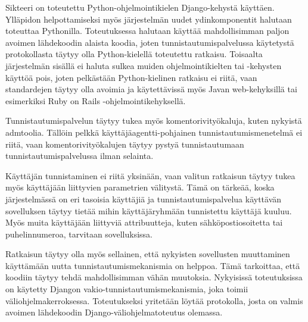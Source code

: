 Sikteeri on toteutettu Python-ohjelmointikielen Django-kehystä käyttäen. Ylläpidon helpottamiseksi myös järjestelmän uudet ydinkomponentit halutaan toteuttaa Pythonilla. Toteutuksessa halutaan käyttää mahdollisimman paljon avoimen lähdekoodin alaista koodia, joten tunnistautumispalvelussa käytetystä protokollasta täytyy olla Python-kielellä toteutettu ratkaisu. Toisaalta järjestelmän sisällä ei haluta sulkea muiden ohjelmointikielten tai -kehysten käyttöä pois, joten pelkästään Python-kielinen ratkaisu ei riitä, vaan standardejen täytyy olla avoimia ja käytettävissä myös Javan web-kehyksillä tai esimerkiksi Ruby on Rails -ohjelmointikehyksellä.

Tunnistautumispalvelun täytyy tukea myös komentorivityökaluja, kuten nykyistä admtoolia. Tällöin pelkkä käyttäjäagentti-pohjainen tunnistautumismenetelmä ei riitä, vaan komentorivityökalujen täytyy pystyä tunnistautumaan tunnistautumispalvelussa ilman selainta.

Käyttäjän tunnistaminen ei riitä yksinään, vaan valitun ratkaisun täytyy tukea myös käyttäjään liittyvien parametrien välitystä. Tämä on tärkeää, koska järjestelmässä on eri tasoisia käyttäjiä ja tunnistautumispalvelua käyttävän sovelluksen täytyy tietää mihin käyttäjäryhmään tunnistettu käyttäjä kuuluu. Myös muita käyttäjään liittyviä attribuutteja, kuten sähköpostiosoitetta tai puhelinnumeroa, tarvitaan sovelluksissa.

Ratkaisun täytyy olla myös sellainen, että nykyisten sovellusten muuttaminen käyttämään uutta tunnistautumismekanismia on helppoa. Tämä tarkoittaa, että koodiin täytyy tehdä mahdollisimman vähän muutoksia. Nykyisissä toteutuksissa on käytetty Djangon vakio-tunnistautumismekanismia, joka toimii väliohjelmakerroksessa. Toteutukseksi yritetään löytää protokolla, josta on valmis avoimen lähdekoodin Django-väliohjelmatoteutus olemassa.